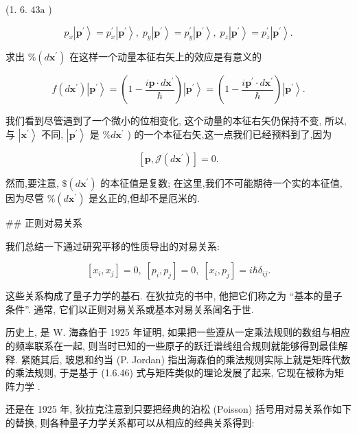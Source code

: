 \documentclass[lang=cn,newtx,10pt,scheme=chinese,thmcnt=section]{elegantbook}
\begin{document}
(1. 6. ${43}\mathrm{a}$ )

$$
{p}_{x}\left| {\mathbf{p}}^{\prime }\right\rangle = {p}_{x}^{\prime }\left| {\mathbf{p}}^{\prime }\right\rangle ,\;{p}_{y}\left| {\mathbf{p}}^{\prime }\right\rangle = {p}_{y}^{\prime }\left| {\mathbf{p}}^{\prime }\right\rangle ,\;{p}_{z}\left| {\mathbf{p}}^{\prime }\right\rangle = {p}_{z}^{\prime }\left| {\mathbf{p}}^{\prime }\right\rangle . \tag{1.6.43b}
$$

求出 $\% \left( {d{\mathbf{x}}^{\prime }}\right)$ 在这样一个动量本征右矢上的效应是有意义的

$$
f\left( {d{\mathbf{x}}^{\prime }}\right) \left| {\mathbf{p}}^{\prime }\right\rangle = \left( {1 - \frac{i\mathbf{p} \cdot d{\mathbf{x}}^{\prime }}{\hbar }}\right) \left| {\mathbf{p}}^{\prime }\right\rangle = \left( {1 - \frac{i{\mathbf{p}}^{\prime } \cdot d{\mathbf{x}}^{\prime }}{\hbar }}\right) \left| {\mathbf{p}}^{\prime }\right\rangle . \tag{1.6.44}
$$

我们看到尽管遇到了一个微小的位相变化, 这个动量的本征右矢仍保持不变, 所以, 与 $\left| {\mathbf{x}}^{\prime }\right\rangle$ 不同, $\left| {\mathbf{p}}^{\prime }\right\rangle$ 是 $\% d{\mathbf{x}}^{\prime }$ ) 的一个本征右矢,这一点我们已经预料到了,因为

$$
\left\lbrack {\mathbf{p},\mathcal{J}\left( {d{\mathbf{x}}^{\prime }}\right) }\right\rbrack = 0. \tag{1.6.45}
$$

然而,要注意, $\$ \left( {d{\mathbf{x}}^{\prime }}\right)$ 的本征值是复数; 在这里,我们不可能期待一个实的本征值,因为尽管 $\% \left( {d{\mathbf{x}}^{\prime }}\right)$ 是幺正的,但却不是厄米的.

## 正则对易关系

我们总结一下通过研究平移的性质导出的对易关系:

$$
\left\lbrack {{x}_{i},{x}_{j}}\right\rbrack = 0,\;\left\lbrack {{p}_{i},{p}_{j}}\right\rbrack = 0,\;\left\lbrack {{x}_{i},{p}_{j}}\right\rbrack = i\hbar {\delta }_{ij}. \tag{1.6.46}
$$

这些关系构成了量子力学的基石. 在狄拉克的书中, 他把它们称之为 “基本的量子条件”. 通常, 它们以正则对易关系或基本对易关系闻名于世.

历史上, 是 W. 海森伯于 1925 年证明, 如果把一些遵从一定乘法规则的数组与相应的频率联系在一起, 则当时已知的一些原子的跃迁谱线组合规则就能够得到最佳解释. 紧随其后, 玻恩和约当 (P. Jordan) 指出海森伯的乘法规则实际上就是矩阵代数的乘法规则, 于是基于 (1.6.46) 式与矩阵类似的理论发展了起来, 它现在被称为矩阵力学 .

还是在 1925 年, 狄拉克注意到只要把经典的泊松 (Poisson) 括号用对易关系作如下的替换, 则各种量子力学关系都可以从相应的经典关系得到:
\end{document}
